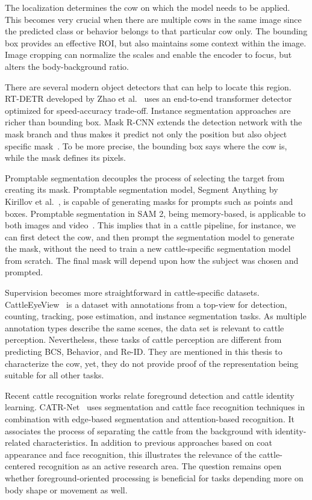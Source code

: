 The localization determines the cow on which the model needs to be applied. This becomes very crucial when there are multiple cows in the same image since the predicted class or behavior belongs to that particular cow only. The bounding box provides an effective ROI, but also maintains some context within the image. Image cropping can normalize the scales and enable the encoder to focus, but alters the body-background ratio.

There are several modern object detectors that can help to locate this region. RT-DETR developed by Zhao et al.~\cite{zhao2024rtdetr} uses an end-to-end transformer detector optimized for speed-accuracy trade-off. Instance segmentation approaches are richer than bounding box. Mask R-CNN extends the detection network with the mask branch and thus makes it predict not only the position but also object specific mask~\cite{he2017maskrcnn}. To be more precise, the bounding box says where the cow is, while the mask defines its pixels.

Promptable segmentation decouples the process of selecting the target from creating its mask. Promptable segmentation model, Segment Anything by Kirillov et al.~\cite{kirillov2023sam}, is capable of generating masks for prompts such as points and boxes. Promptable segmentation in SAM 2, being memory-based, is applicable to both images and video~\cite{ravi2024sam2}. This implies that in a cattle pipeline, for instance, we can first detect the cow, and then prompt the segmentation model to generate the mask, without the need to train a new cattle-specific segmentation model from scratch.  The final mask will depend upon how the subject was chosen and prompted.

Supervision becomes more straightforward in cattle-specific datasets. CattleEyeView~\cite{ong2023cattleeyeview} is a dataset with annotations from a top-view for detection, counting, tracking, pose estimation, and instance segmentation tasks. As multiple annotation types describe the same scenes, the data set is relevant to cattle perception. Nevertheless, these tasks of cattle perception are different from predicting BCS, Behavior, and Re-ID. They are mentioned in this thesis to characterize the cow, yet, they do not provide proof of the representation being suitable for all other tasks.

Recent cattle recognition works relate foreground detection and cattle identity learning. CATR-Net~\cite{feng2025catr} uses segmentation and cattle face recognition techniques in combination with edge-based segmentation and attention-based recognition. It associates the process of separating the cattle from the background with identity-related characteristics. In addition to previous approaches based on coat appearance and face recognition, this illustrates the relevance of the cattle-centered recognition as an active research area. The question remains open whether foreground-oriented processing is beneficial for tasks depending more on body shape or movement as well.

